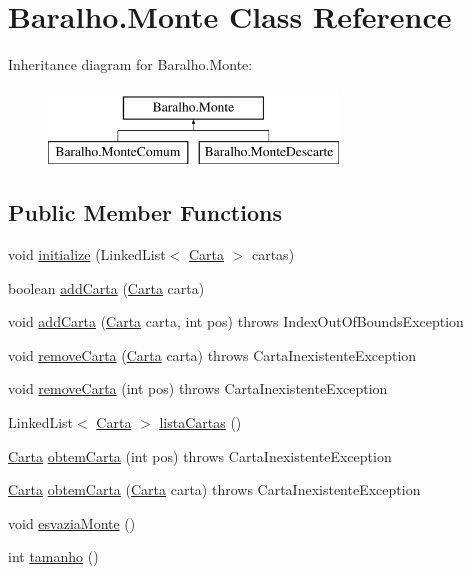 \hypertarget{class_baralho_1_1_monte}{
\section{Baralho.Monte Class Reference}
\label{class_baralho_1_1_monte}
}
Inheritance diagram for Baralho.Monte:\begin{figure}[H]
\begin{center}
\leavevmode
\includegraphics[height=2.000000cm]{class_baralho_1_1_monte}
\end{center}
\end{figure}
\subsection*{Public Member Functions}
\begin{DoxyCompactItemize}
\item 
void \hyperlink{class_baralho_1_1_monte_a9c0e60ff3e5adee7c73311dc639b726d}{initialize} (LinkedList$<$ \hyperlink{class_baralho_1_1_carta}{Carta} $>$ cartas)
\item 
boolean \hyperlink{class_baralho_1_1_monte_a62727fc8f2a5df78acf7ed256907d18d}{addCarta} (\hyperlink{class_baralho_1_1_carta}{Carta} carta)
\item 
void \hyperlink{class_baralho_1_1_monte_a54573fe9edbac3f8d9fca1fe1199debb}{addCarta} (\hyperlink{class_baralho_1_1_carta}{Carta} carta, int pos)  throws IndexOutOfBoundsException
\item 
void \hyperlink{class_baralho_1_1_monte_a64abc4bdca4718cb5e615154c562cf85}{removeCarta} (\hyperlink{class_baralho_1_1_carta}{Carta} carta)  throws CartaInexistenteException
\item 
void \hyperlink{class_baralho_1_1_monte_a81b0e1160db4914f5b1ba51fc068b1b9}{removeCarta} (int pos)  throws CartaInexistenteException 
\item 
LinkedList$<$ \hyperlink{class_baralho_1_1_carta}{Carta} $>$ \hyperlink{class_baralho_1_1_monte_a586ca35231a6c8a8634600df898f5ccc}{listaCartas} ()
\item 
\hyperlink{class_baralho_1_1_carta}{Carta} \hyperlink{class_baralho_1_1_monte_adeda515ad018d4975fbf054a37ab0f36}{obtemCarta} (int pos)  throws CartaInexistenteException
\item 
\hyperlink{class_baralho_1_1_carta}{Carta} \hyperlink{class_baralho_1_1_monte_ad724ab32986fbbc07e3d492aecfa2037}{obtemCarta} (\hyperlink{class_baralho_1_1_carta}{Carta} carta)  throws CartaInexistenteException 
\item 
void \hyperlink{class_baralho_1_1_monte_abd353fab5c3bfe77a070aafe7d905bec}{esvaziaMonte} ()
\item 
int \hyperlink{class_baralho_1_1_monte_a8768f18eb0e16b7a2be665360ad4afb5}{tamanho} ()
\end{DoxyCompactItemize}


